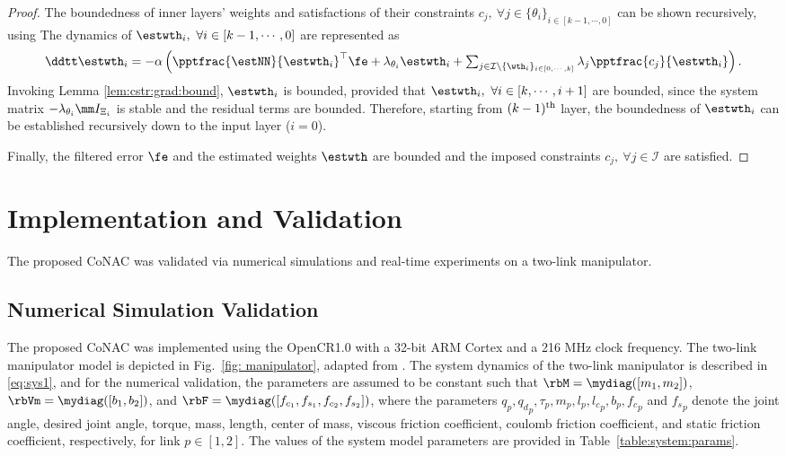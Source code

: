 \documentclass[final,5p,times,twocolumn,authoryear]{elsarticle}
\begin{document}
\begin{proof}
The boundedness of inner layers' weights and satisfactions of their constraints $c_j,\ \forall j\in\{\theta_i\}_{i\in[k-1,\cdots,0]}$ can be shown recursively, using \cite[Chap.~4 T.~1.9]{Desoer:2009aa}
The dynamics of $\estwth_i,\ \forall i\in[k-1,\cdots,0]$ are represented as
\begin{equation}
    \ddtt \estwth_i 
    =
    -\alpha
    \left(
        \pptfrac{\estNN}{\estwth_i}^\top
        \fe
        +
        \lambda_{\theta_i}\estwth_i
        +
        \textstyle\sum_{
            j\in\mathcal{I}\setminus \{\wth_i\}_{i\in[0,\cdots,k]}
        }
        \lambda_j
        \pptfrac{c_j}{\estwth_i}
    \right)
    .
\end{equation}
Invoking Lemma \ref{lem:cstr:grad:bound}, $\estwth_i$ is bounded, provided that $\estwth_i,\ \forall i\in[k,\cdots,i+1]$ are bounded, since the system matrix $-\lambda_{\theta_i} \mm I_{\Xi_i}$ is stable and the residual terms are bounded.
Therefore, starting from $(k-1)\textsuperscript{th}$ layer, the boundedness of $\estwth_i$ can be established recursively down to the input layer ($i=0$).

\hfill

Finally, the filtered error $\fe$ and the estimated weights $\estwth$ are bounded and the imposed constraints $c_j,\ \forall j\in\mathcal I$ are satisfied.

\end{proof}

\section{Implementation and Validation}\label{sec:sim}

The proposed CoNAC was validated via numerical simulations and real-time experiments on a two-link manipulator.

\subsection{Numerical Simulation Validation}

The proposed CoNAC was implemented using the OpenCR1.0 \cite{opencr} with a 32-bit ARM Cortex and a 216 MHz clock frequency.
The two-link manipulator model is depicted in Fig.~\ref{fig: manipulator}, adapted from \cite{Markus:2013aa}. 
The system dynamics of the two-link manipulator is described in \eqref{eq:sys1}, and for the numerical validation, the parameters are assumed to be constant such that $\rbM=\mydiag([m_1,m_2])$, $\rbVm=\mydiag([b_1,b_2])$, and $\rbF=\mydiag([f_{c_1},f_{s_1},f_{c_2},f_{s_2}])$,
where the parameters $q_p,{q_d}_p,\tau_p,m_p,l_p,{l_c}_p,b_p,{f_c}_p$ and ${f_s}_p$ denote the joint angle, desired joint angle, torque, mass, length, center of mass, viscous friction coefficient, coulomb friction coefficient, and static friction coefficient, respectively, for link $p\in[1,2]$.
The values of the system model parameters are provided in Table~\ref{table:system:params}. 
\end{document}
